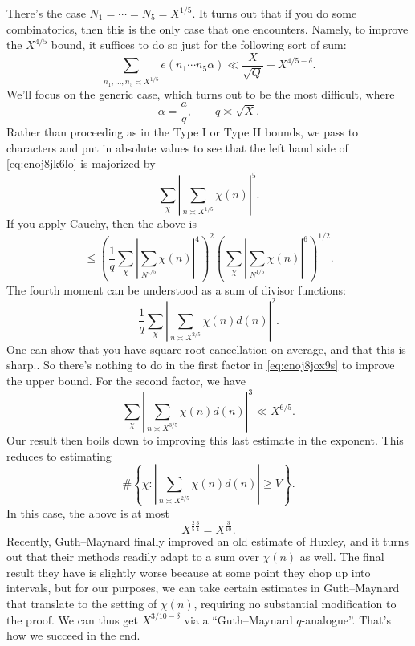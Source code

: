 \documentclass[reqno]{amsart} 
\begin{document}
There's the case $N_1 = \dotsb = N_5 = X^{1/5}$.  It turns out that if you do some combinatorics, then this is the only case that one encounters.  Namely, to improve the $X^{4/5}$ bound, it suffices to do so just for the following sort of sum:
\begin{equation}\label{eq:cnoj8jk6lo}
  \sum_{n_1, \dotsc, n_5 \asymp X^{1/5}}
  e(n_1 \dotsb n_5 \alpha)
  \ll \frac{X}{\sqrt{Q}}
  + X^{4/5 - \delta}.
\end{equation}
We'll focus on the generic case, which turns out to be the most difficult, where
\begin{equation*}
  \alpha = \frac{a}{q}, \qquad
  q \asymp \sqrt{X}.
\end{equation*}
Rather than proceeding as in the Type I or Type II bounds, we pass to characters and put in absolute values to see that the left hand side of \eqref{eq:cnoj8jk6lo} is majorized by
\begin{equation*}
  \sum_{\chi}
  \left| \sum_{n \asymp X^{1/5}}
    \chi(n)\right|^5.
\end{equation*}
If you apply Cauchy, then the above is
\begin{equation}\label{eq:cnoj8jox9s}
  \leq \left( \frac{1}{q}
    \sum_\chi
    \left| \sum_{N^{1/5}} \chi(n) \right|^4\right)^2
  \left( \sum_\chi
    \left| \sum_{N^{1/5}} \chi(n) \right|^6\right)^{1/2}.
\end{equation}
The fourth moment can be understood as a sum of divisor functions:
\begin{equation*}
  \frac{1}{q} \sum_\chi \left| \sum_{n \asymp X^{2/5}} \chi(n) d(n) \right|^2.
\end{equation*}
One can show that you have square root cancellation on average, and that this is sharp..  So there's nothing to do in the first factor in \eqref{eq:cnoj8jox9s} to improve the upper bound.  For the second factor, we have
\begin{equation*}
  \sum_{\chi} \left| \sum_{n \asymp X^{3/5}}
    \chi(n) d(n)\right|^3 \ll X^{6/5}.
\end{equation*}
Our result then boils down to improving this last estimate in the exponent.  This reduces to estimating
\begin{equation*}
  \# \left\{ \chi : \left| \sum_{n \asymp X^{2/5}} \chi(n) d(n) \right| \geq V \right\}.
\end{equation*}
In this case, the above is at most
\begin{equation*}
  X^{\frac{2}{5} \frac{3}{4}}
  = X^{\frac{3}{10}}.
\end{equation*}
Recently, Guth--Maynard finally improved an old estimate of Huxley, and it turns out that their methods readily adapt to a sum over $\chi(n)$ as well.  The final result they have is slightly worse because at some point they chop up into intervals, but for our purposes, we can take certain estimates in Guth--Maynard that translate to the setting of $\chi(n)$, requiring no substantial modification to the proof.  We can thus get $X^{3/10 - \delta}$ via a ``Guth--Maynard $q$-analogue''.  That's how we succeed in the end.
\end{document}
